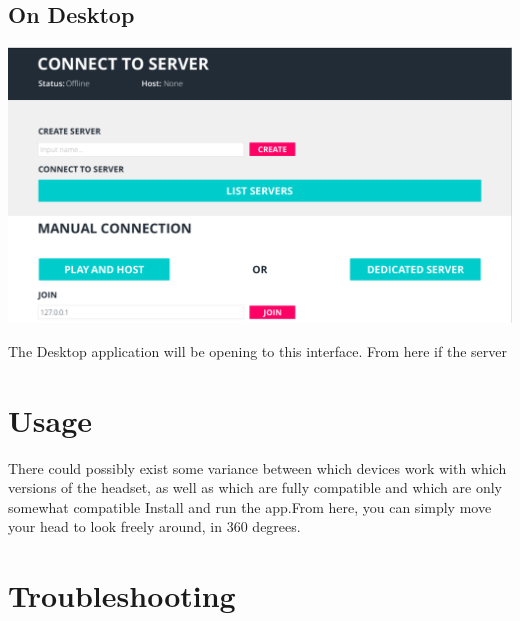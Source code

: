 \documentclass[english]{article}
\begin{document}
\subsection{On Desktop}
\includegraphics[scale=0.4]{deskInteraction.png}

The Desktop application will be opening to this interface. From here if the server 

\section{Usage} 
There could possibly exist some variance between which devices work with which versions of the headset, as well as which are fully compatible and which are only somewhat compatible \newline
\newline
Install and run the app.\newline From here, you can simply move your head to look freely around, in 360 degrees.

\section{Troubleshooting}
\end{document}
